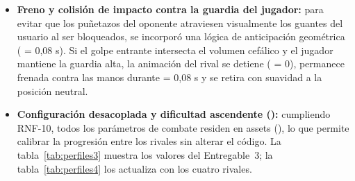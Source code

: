 \begin{itemize}
  \item \textbf{Freno y colisión de impacto contra la guardia del jugador:} para evitar que los puñetazos del oponente atraviesen visualmente los guantes del usuario al ser bloqueados, se incorporó una lógica de anticipación geométrica ( = 0,08 s). Si el golpe entrante intersecta el volumen cefálico y el jugador mantiene la guardia alta, la animación del rival se detiene ( = 0), permanece frenada contra las manos durante  = 0,08 s y se retira con suavidad a la posición neutral.
  \item \textbf{Configuración desacoplada y dificultad ascendente ():} cumpliendo RNF-10, todos los parámetros de combate residen en assets  (), lo que permite calibrar la progresión entre los rivales sin alterar el código. La tabla~\ref{tab:perfiles3} muestra los valores del Entregable~3; la tabla~\ref{tab:perfiles4} los actualiza con los cuatro rivales.
\end{itemize}

\begin{table}[H]
\centering
\caption{Perfiles de los tres primeros rivales en el Entregable 3.}
\label{tab:perfiles3}
\end{table}

